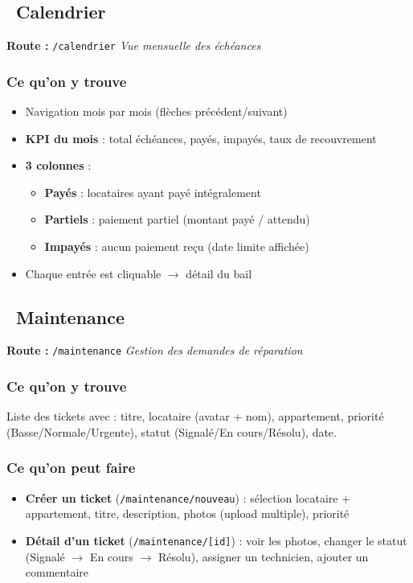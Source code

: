 \documentclass[12pt,a4paper]{article}
\begin{document}
\subsection{\faCalendarAlt\ Calendrier}
\textbf{Route :} \texttt{/calendrier} \hfill \textit{Vue mensuelle des \'ech\'eances}

\subsubsection{Ce qu'on y trouve}
\begin{itemize}
\item Navigation mois par mois (fl\`eches pr\'ec\'edent/suivant)
\item \textbf{KPI du mois} : total \'ech\'eances, pay\'es, impay\'es, taux de recouvrement
\item \textbf{3 colonnes} :
  \begin{itemize}
  \item \textcolor{vertOk}{\textbf{Pay\'es}} : locataires ayant pay\'e int\'egralement
  \item \textcolor{orangeWarn}{\textbf{Partiels}} : paiement partiel (montant pay\'e / attendu)
  \item \textcolor{rougeAlert}{\textbf{Impay\'es}} : aucun paiement re\c{c}u (date limite affich\'ee)
  \end{itemize}
\item Chaque entr\'ee est cliquable $\rightarrow$ d\'etail du bail
\end{itemize}

\subsection{\faWrench\ Maintenance}
\textbf{Route :} \texttt{/maintenance} \hfill \textit{Gestion des demandes de r\'eparation}

\subsubsection{Ce qu'on y trouve}
Liste des tickets avec : titre, locataire (avatar + nom), appartement, priorit\'e (Basse/Normale/Urgente), statut (Signal\'e/En cours/R\'esolu), date.

\subsubsection{Ce qu'on peut faire}
\begin{itemize}
\item \textbf{Cr\'eer un ticket} (\texttt{/maintenance/nouveau}) : s\'election locataire + appartement, titre, description, photos (upload multiple), priorit\'e
\item \textbf{D\'etail d'un ticket} (\texttt{/maintenance/[id]}) : voir les photos, changer le statut (Signal\'e $\rightarrow$ En cours $\rightarrow$ R\'esolu), assigner un technicien, ajouter un commentaire
\end{itemize}
\end{document}
